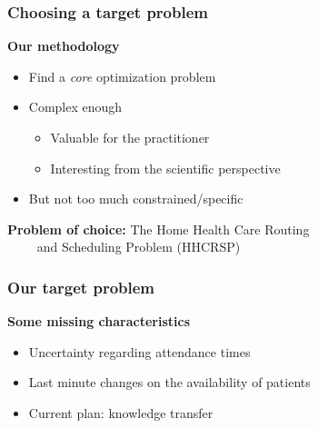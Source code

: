 \begin{frame}
   \frametitle{Choosing a target problem}

   \textbf{Our methodology}
   \begin{itemize}
      \item Find a \textit{core} optimization problem
      \item Complex enough
      \begin{itemize}
         \item Valuable for the practitioner
         \item Interesting from the scientific perspective
      \end{itemize}
      \item But not too much constrained/specific
   \end{itemize}

   \vspace*{18pt}
  \pause


   \textbf{Problem of choice: } The Home Health Care Routing \\
   \qquad \qquad \qquad \qquad ~~~~ and Scheduling Problem (HHCRSP)



\end{frame}

\begin{frame}
   \frametitle{Our target problem}

   \textbf{Some missing characteristics}
   \begin{itemize}
      \item Uncertainty regarding attendance times
      \item Last minute changes on the availability of patients
      \item Current plan: knowledge transfer
   \end{itemize}
\end{frame}

